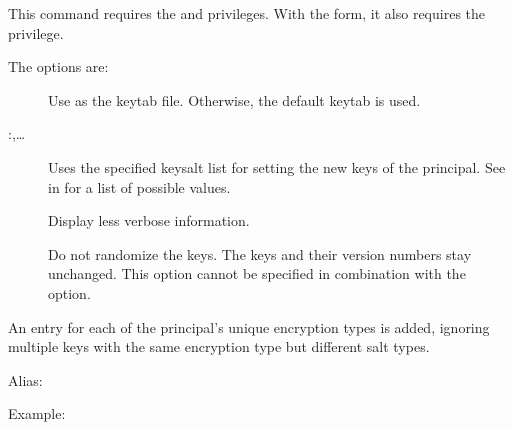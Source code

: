 \documentclass[letterpaper,10pt,english]{sphinxmanual}
\begin{document}
\sphinxAtStartPar
This command requires the  and  privileges.
With the  form, it also requires the  privilege.

\sphinxAtStartPar
The options are:
\begin{description}
\item[{ }] \leavevmode
\sphinxAtStartPar
Use  as the keytab file.  Otherwise, the default keytab is
used.

\item[{ :,…}] \leavevmode
\sphinxAtStartPar
Uses the specified keysalt list for setting the new keys of the
principal.  See {\hyperref[\detokenize{admin/conf_files/kdc_conf:keysalt-lists}]{}} in {\hyperref[\detokenize{admin/conf_files/kdc_conf:kdc-conf-5}]{}} for a
list of possible values.

\item[{}] \leavevmode
\sphinxAtStartPar
Display less verbose information.

\item[{}] \leavevmode
\sphinxAtStartPar
Do not randomize the keys. The keys and their version numbers stay
unchanged.  This option cannot be specified in combination with the
 option.

\end{description}

\sphinxAtStartPar
An entry for each of the principal’s unique encryption types is added,
ignoring multiple keys with the same encryption type but different
salt types.

\sphinxAtStartPar
Alias: 

\sphinxAtStartPar
Example:

\begin{sphinxVerbatim}[commandchars=\\\{\}]
    
      
          
\end{sphinxVerbatim}
\end{document}
